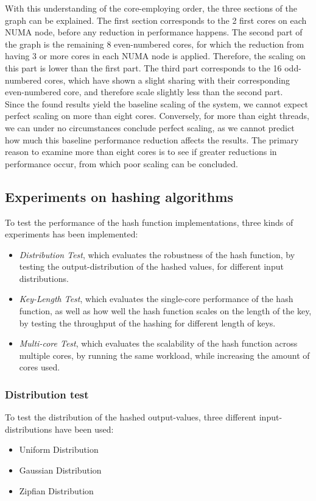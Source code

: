 \documentclass[11pt]{article} %
\begin{document}
With this understanding of the core-employing order, the three sections of the graph can be explained. The first section corresponds to the 2 first cores on each NUMA node, before any reduction in performance happens. The second part of the graph is the remaining 8 even-numbered cores, for which the reduction from having 3 or more cores in each NUMA node is applied. Therefore, the scaling on this part is lower than the first part. The third part corresponds to the 16 odd-numbered cores, which have shown a slight sharing with their corresponding even-numbered core, and therefore scale slightly less than the second part.\\

Since the found results yield the baseline scaling of the system, we cannot expect perfect scaling on more than eight cores. Conversely, for more than eight threads, we can under no circumstances conclude perfect scaling, as we cannot predict how much this baseline performance reduction affects the results. The primary reason to examine more than eight cores is to see if greater reductions in performance occur, from which poor scaling can be concluded.

\subsection{Experiments on hashing algorithms}
To test the performance of the hash function implementations, three kinds of experiments has been implemented:
\begin{itemize}
  \item \emph{Distribution Test}, which evaluates the robustness of the hash function, by testing the output-distribution of the hashed values, for different input distributions. 
  \item \emph{Key-Length Test}, which evaluates the single-core performance of the hash function, as well as how well the hash function scales on the length of the key, by testing the throughput of the hashing for different length of keys.
  \item \emph{Multi-core Test}, which evaluates the scalability of the hash function across multiple cores, by running the same workload, while increasing the amount of cores used. 
\end{itemize}

\subsubsection{Distribution test}
To test the distribution of the hashed output-values, three different input-distributions have been used:
\begin{itemize}
  \item Uniform Distribution
  \item Gaussian Distribution
  \item Zipfian Distribution
\end{itemize}
\end{document}
